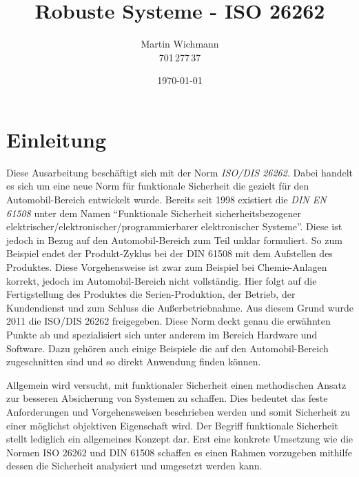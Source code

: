 \documentclass[a4paper,DIV=calc,ngerman]{scrartcl}
\begin{document}
\titlehead{}
\title{Robuste Systeme - ISO 26262}
\author{Martin Wichmann\\701\,277\,37}
\date{\today}

\maketitle
\tableofcontents

\thispagestyle{empty}

\newpage
\setcounter{page}{1}

\section{Einleitung}
\label{sec:Einleitung}
Diese Ausarbeitung beschäftigt sich mit der Norm \emph{ISO/DIS 26262}. Dabei handelt es sich um eine neue Norm für funktionale Sicherheit die gezielt für den Automobil-Bereich entwickelt wurde. Bereits seit 1998 existiert die \emph{DIN EN 61508} unter dem Namen "`Funktionale Sicherheit sicherheitsbezogener elektrischer/elektronischer/programmierbarer elektronischer Systeme"'. Diese ist jedoch in Bezug auf den Automobil-Bereich zum Teil unklar formuliert. So zum Beispiel endet der Produkt-Zyklus bei der DIN 61508 mit dem Aufstellen des Produktes. Diese Vorgehensweise ist zwar zum Beispiel bei Chemie-Anlagen korrekt, jedoch im Automobil-Bereich nicht vollständig. Hier folgt auf die Fertigstellung des Produktes die Serien-Produktion, der Betrieb, der Kundendienst und zum Schluss die Außerbetriebnahme. Aus diesem Grund wurde 2011 die ISO/DIS 26262 freigegeben. Diese Norm deckt genau die erwähnten Punkte ab und spezialisiert sich unter anderem im Bereich Hardware und Software. Dazu gehören auch einige Beispiele die auf den Automobil-Bereich zugeschnitten sind und so direkt Anwendung finden können.

Allgemein wird versucht, mit funktionaler Sicherheit einen methodischen Ansatz zur besseren Absicherung von Systemen zu schaffen. Dies bedeutet das feste Anforderungen und Vorgehensweisen beschrieben werden und somit Sicherheit zu einer möglichst objektiven Eigenschaft wird. Der Begriff funktionale Sicherheit stellt lediglich ein allgemeines Konzept dar. Erst eine konkrete Umsetzung wie die Normen ISO 26262 und DIN 61508 schaffen es einen Rahmen vorzugeben mithilfe dessen die Sicherheit analysiert und umgesetzt werden kann.
\end{document}
